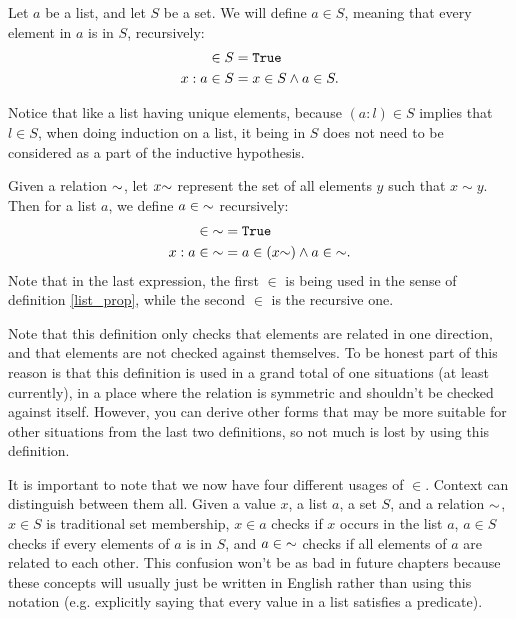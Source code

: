 \documentclass[../../math.tex]{subfiles}
\begin{document}
\begin{definition} \label{list_prop}
    Let $a$ be a list, and let $S$ be a set.  We will define $a \in S$, meaning
    that every element in $a$ is in $S$, recursively:
    \begin{align*}
           [] \in S &= \vtt{True} \\
        x : a \in S &= x \in S \wedge a \in S.
    \end{align*}
\end{definition}
\noindent Notice that like a list having unique elements, because $(a : l) \in
S$ implies that $l \in S$, when doing induction on a list, it being in $S$ does
not need to be considered as a part of the inductive hypothesis.

\begin{definition}
    Given a relation ${\sim}$, let $x {\sim}$ represent the set of all elements
    $y$ such that $x \sim y$.  Then for a list $a$, we define $a \in {\sim}$
    recursively:
    \begin{align*}
           [] \in \usim &= \vtt{True} \\
        x : a \in \usim &= a \in (x \usim) \wedge a \in \usim.
    \end{align*}
    Note that in the last expression, the first $\in$ is being used in the sense
    of definition \ref{list_prop}, while the second $\in$ is the recursive one.
\end{definition}

Note that this definition only checks that elements are related in one
direction, and that elements are not checked against themselves.  To be honest
part of this reason is that this definition is used in a grand total of one
situations (at least currently), in a place where the relation is symmetric and
shouldn't be checked against itself.  However, you can derive other forms that
may be more suitable for other situations from the last two definitions, so not
much is lost by using this definition.

It is important to note that we now have four different usages of $\in$.
Context can distinguish between them all.  Given a value $x$, a list $a$, a set
$S$, and a relation ${\sim}$, $x \in S$ is traditional set membership, $x \in a$
checks if $x$ occurs in the list $a$, $a \in S$ checks if every elements of $a$
is in $S$, and $a \in {\sim}$ checks if all elements of $a$ are related to each
other.  This confusion won't be as bad in future chapters because these concepts
will usually just be written in English rather than using this notation (e.g.
explicitly saying that every value in a list satisfies a predicate).
\end{document}
